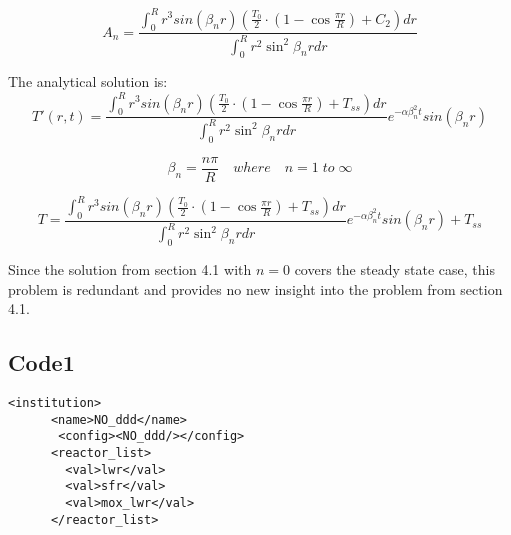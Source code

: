 \documentclass[12pt,letterpaper]{article}
\begin{document}
\[A_n = \frac{\int_{0}^{R}  r^3 sin(\beta_n r) (\frac{T_0}{2} \cdot (1-\cos{\frac{\pi r}{R}}) + C_2) dr} {\int_{0}^{R} r^2 \sin^2{\beta_n r} dr }\]

The analytical solution is:
\[T'(r,t) = \frac{\int_{0}^{R}  r^3 sin(\beta_n r) (\frac{T_0}{2} \cdot (1-\cos{\frac{\pi r}{R}}) + T_{ss}) dr} {\int_{0}^{R} r^2 \sin^2{\beta_n r} dr } e^{-\alpha \beta_n^2 t} sin(\beta_n r)\]

\[\beta_n = \frac{n\pi}{R} \quad where \quad n = 1 \; to \; \infty \]

\[T = \frac{\int_{0}^{R}  r^3 sin(\beta_n r) (\frac{T_0}{2} \cdot (1-\cos{\frac{\pi r}{R}}) + T_{ss}) dr} {\int_{0}^{R} r^2 \sin^2{\beta_n r} dr } e^{-\alpha \beta_n^2 t} sin(\beta_n r) + T_{ss} \]

Since the solution from section 4.1 with $n=0$ covers the 
steady state case, this problem is redundant and provides
no new insight into the problem from section 4.1.


\subsection{Code1}
\begin{verbatim}
<institution>
      <name>NO_ddd</name>
       <config><NO_ddd/></config>
      <reactor_list>
        <val>lwr</val>
        <val>sfr</val>
        <val>mox_lwr</val>
      </reactor_list>
\end{verbatim}
\end{document}
